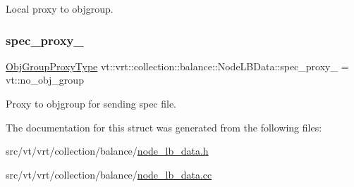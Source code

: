 Local proxy to objgroup. 

\mbox{\label{structvt_1_1vrt_1_1collection_1_1balance_1_1_node_l_b_data_a6c5b8fc44e6710f090c4a78f5ffb0c71}} 
\subsubsection{\texorpdfstring{spec\+\_\+proxy\+\_\+}{spec\_proxy\_}}
{\footnotesize\ttfamily \hyperlink{namespacevt_ad7cae989df485fccca57f0792a880a8e}{Obj\+Group\+Proxy\+Type} vt\+::vrt\+::collection\+::balance\+::\+Node\+L\+B\+Data\+::spec\+\_\+proxy\+\_\+ = vt\+::no\+\_\+obj\+\_\+group\hspace{0.3cm}{\ttfamily [private]}}



Proxy to objgroup for sending spec file. 



The documentation for this struct was generated from the following files\+:\begin{DoxyCompactItemize}
\item 
src/vt/vrt/collection/balance/\hyperlink{node__lb__data_8h}{node\+\_\+lb\+\_\+data.\+h}\item 
src/vt/vrt/collection/balance/\hyperlink{node__lb__data_8cc}{node\+\_\+lb\+\_\+data.\+cc}\end{DoxyCompactItemize}
